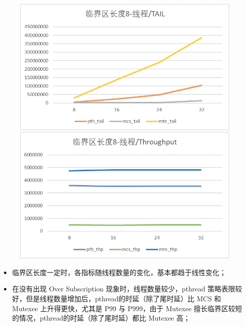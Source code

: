 \documentclass[UTF8]{ctexart}
\begin{document}
\begin{figure}[!h]
    \centering
    \begin{minipage}{0.49\linewidth}
        \centering
        \includegraphics[scale=0.64]{../images/13.png}
    \end{minipage}
    \begin{minipage}{0.49\linewidth}
        \centering
        \includegraphics[scale=0.64]{../images/14.png}
    \end{minipage}
\end{figure}

\newpage

\begin{itemize}
    \item 临界区长度一定时，各指标随线程数量的变化，基本都趋于线性变化；

    \item 在没有出现 Over Subscription 现象时，线程数量较少，pthread 策略表限较好，但是线程数量增加后，pthread的时延（除了尾时延）比 MCS 和 Mutexee 上升得更快，尤其是 P99 与 P999，由于 Mutexee 擅长临界区较短的情况，pthread的时延（除了尾时延）都比 Mutexee 高；
\end{itemize}
\end{document}
